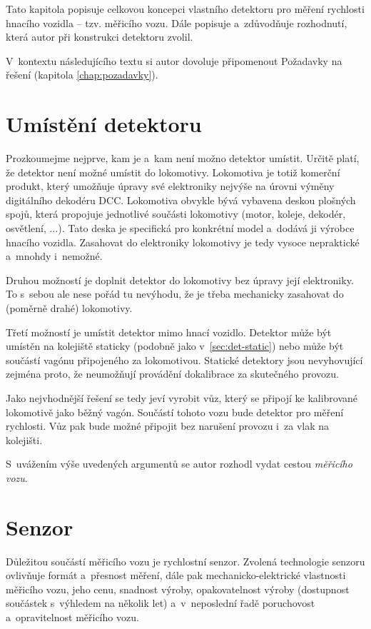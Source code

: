 Tato kapitola popisuje celkovou koncepci vlastního detektoru pro měření
rychlosti hnacího vozidla -- tzv. měřicího vozu. Dále popisuje
a~zdůvodňuje rozhodnutí, která autor při konstrukci detektoru zvolil.

V~kontextu následujícího textu si autor dovoluje připomenout Požadavky
na řešení (kapitola \ref{chap:pozadavky}).

\section{Umístění detektoru}
\label{sec:wsm-senzor-umisteni}

Prozkoumejme nejprve, kam je a~kam není možno detektor umístit. Určitě platí, že
detektor není možné umístit do lokomotivy. Lokomotiva je totiž komerční
produkt, který umožňuje úpravy své elektroniky nejvýše na úrovni výměny
digitálního dekodéru \gls{DCC}. Lokomotiva obvykle bývá vybavena deskou
plošných spojů, která propojuje jednotlivé součásti lokomotivy (motor, koleje,
dekodér, osvětlení, ...). Tato deska je specifická pro konkrétní model a~dodává
ji výrobce hnacího vozidla. Zasahovat do elektroniky lokomotivy je tedy vysoce
nepraktické a~mnohdy i~nemožné.

Druhou možností je doplnit detektor do lokomotivy bez úpravy její elektroniky.
To s~sebou ale nese pořád tu nevýhodu, že je třeba mechanicky zasahovat do
(poměrně drahé) lokomotivy.

Třetí možností je umístit detektor mimo hnací vozidlo. Detektor může být
umístěn na kolejiště staticky (podobně jako v~\ref{sec:det-static}) nebo může
být součástí vagónu připojeného za lokomotivou. Statické detektory jsou
nevyhovující zejména proto, že neumožňují provádění dokalibrace za skutečného
provozu.

Jako nejvhodnější řešení se tedy jeví vyrobit vůz, který se připojí ke
kalibrované lokomotivě jako běžný vagón. Součástí tohoto vozu bude detektor pro
měření rychlosti. Vůz pak bude možné připojit bez narušení provozu i~za vlak na
 kolejišti.

S~uvážením výše uvedených argumentů se autor rozhodl vydat cestou
\textit{měřicího vozu}.

\section{Senzor}
\label{sec:wsm-senzor}

Důležitou součástí měřicího vozu je rychlostní senzor. Zvolená technologie
senzoru ovlivňuje formát a~přesnost měření, dále pak
me\-cha\-nic\-ko-elek\-t\-ric\-ké vlastnosti měřicího vozu, jeho cenu, snadnost
výroby, opakovatelnost výroby (dostupnost součástek s~výhledem na několik let)
a~v~neposlední řadě poruchovost a~opravitelnost měřicího vozu.


